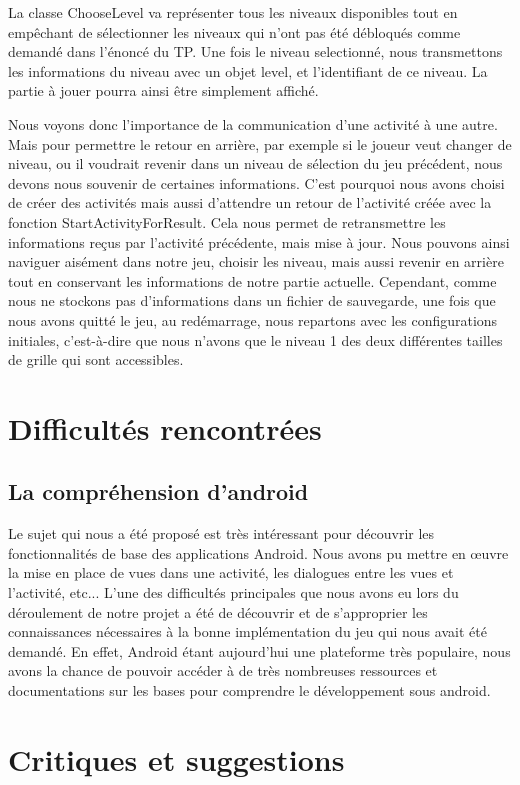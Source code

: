 \documentclass[12pt, a4paper]{article}%
\begin{document}
La classe ChooseLevel va représenter tous les niveaux disponibles tout en empêchant de sélectionner les niveaux qui n'ont pas été débloqués comme demandé dans l'énoncé du TP. Une fois le niveau selectionné, nous transmettons les informations du niveau avec un objet level, et l'identifiant de ce niveau. La partie à jouer pourra ainsi être simplement affiché.

Nous voyons donc l'importance de la communication d'une activité à une autre. Mais pour permettre le retour en arrière, par exemple si le joueur veut changer de niveau, ou il voudrait revenir dans un niveau de sélection du jeu précédent, nous devons nous souvenir de certaines informations. C'est pourquoi nous avons choisi de créer des activités mais aussi d'attendre un retour de l'activité créée avec la fonction StartActivityForResult. Cela nous permet de retransmettre les informations reçus par l'activité précédente, mais mise à jour. Nous pouvons ainsi naviguer aisément dans notre jeu, choisir les niveau, mais aussi revenir en arrière tout en conservant les informations de notre partie actuelle. Cependant, comme nous ne stockons pas d'informations dans un fichier de sauvegarde, une fois que nous avons quitté le jeu, au redémarrage, nous repartons avec les configurations initiales, c'est-à-dire que nous n'avons que le niveau 1 des deux différentes tailles de grille qui sont accessibles.  

\section{Difficultés rencontrées}
  \subsection{La compréhension d'android}
  Le sujet qui nous a été proposé est très intéressant pour découvrir les fonctionnalités de base des applications Android. Nous avons pu mettre en œuvre la mise en place de vues dans une activité, les dialogues entre les vues et l'activité, etc...
L'une des difficultés principales que nous avons eu lors du déroulement de notre projet a été de découvrir et de s'approprier les connaissances nécessaires à la bonne implémentation du jeu qui nous avait été demandé. En effet, Android étant aujourd'hui une plateforme très populaire, nous avons la chance de pouvoir accéder à de très nombreuses ressources et documentations sur les bases pour comprendre le développement sous android.
\section{Critiques et suggestions}
\end{document}
